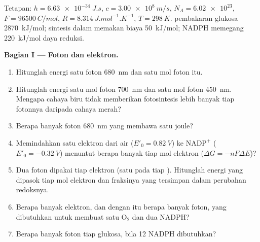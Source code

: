 \begin{problem}
\label{pb:b1:photosynthesis:1}
Tetapan: $h = \qty{6.63e-34}{J.s}$, $c = \qty{3.00e8}{m/s}$,
$N_A = \num{6.02e23}$, $F = \qty{96500}{C/mol}$, $R = \qty{8.314}{J.mol^{-1}.K^{-1}}$,
$T = \qty{298}{K}$.  pembakaran glukosa
\qty{2870}{kJ/mol}; sintesis  dalam  memakan biaya
\qty{50}{kJ/mol}; NADPH memegang \qty{220}{kJ/mol} daya reduksi.

\medskip
\noindent\textbf{Bagian I --- Foton dan elektron.}
\begin{enumerate}
  \item Hitunglah energi satu foton \qty{680}{nm} dan satu mol foton
        itu.
  \item Hitunglah energi satu mol foton \qty{700}{nm} dan satu mol
        foton \qty{450}{nm}. Mengapa cahaya biru tidak memberikan
        fotosintesis lebih banyak tiap fotonnya daripada cahaya merah?
  \item Berapa banyak foton \qty{680}{nm} yang membawa satu joule?
  \item Memindahkan satu elektron dari air ($E'_0 = \qty{+0.82}{V}$) ke
        $\mathrm{NADP^+}$ ($E'_0 = \qty{-0.32}{V}$) menuntut berapa
        banyak  tiap mol elektron ($\Delta G = -nF\Delta E$)?
  \item Dua foton dipakai tiap elektron (satu pada tiap ).
        Hitunglah energi yang dipasok tiap mol elektron dan fraksinya
        yang tersimpan dalam perubahan redoksnya.
  \item Berapa banyak elektron, dan dengan itu berapa banyak foton,
        yang dibutuhkan untuk membuat satu $\mathrm{O_2}$ dan dua NADPH?
  \item Berapa banyak foton tiap glukosa, bila 12 NADPH dibutuhkan?
\end{enumerate}


\end{problem}
